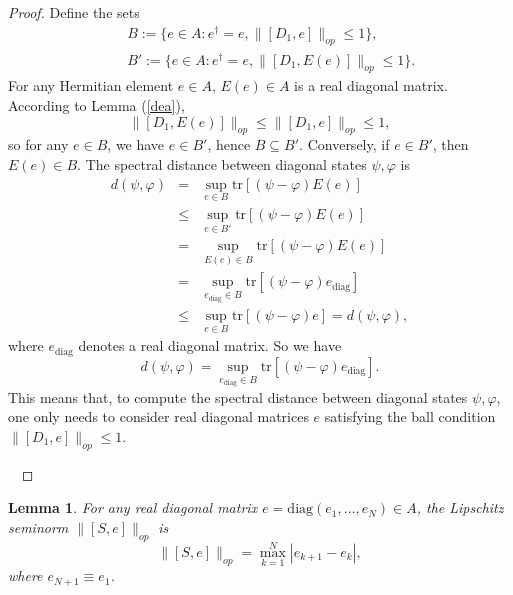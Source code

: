 \documentclass[a4paper,11pt]{article}
\newtheorem{lemma}{Lemma}
\begin{document}
\begin{proof}
  Define the sets
  \begin{eqnarray}
    &&B := \{e \in A : e^{\dag} = e, \|[D_1, e]\|_{op} \leqslant 1\}, \nonumber\\
    &&B':= \{e \in A : e^{\dag} = e, \|[D_1, E (e)]\|_{op} \leqslant 1\} .
  \end{eqnarray}
  For any Hermitian element $e \in A$, $E (e) \in A$ is a real diagonal
  matrix. According to Lemma (\ref{dea}),
  \begin{equation}
    \|[D_1, E (e)]\|_{op} \leqslant \|[D_1, e]\|_{op} \leqslant 1,
  \end{equation}
  so for any $e \in B$, we have $e \in B'$, hence $B \subseteq B'$.
  Conversely, if $e \in B'$, then $E (e) \in B$. The spectral distance between
  diagonal states $\psi, \varphi$ is
  \begin{eqnarray}
    d (\psi, \varphi) & = & \sup_{e \in B} \mathrm{tr} [(\psi - \varphi) E
    (e)] \nonumber\\
    & \leqslant & \sup_{e \in B'} \mathrm{tr} [(\psi - \varphi) E (e)]
    \nonumber\\
    & = & \sup_{E (e) \in B} \mathrm{tr} [(\psi - \varphi) E (e)]
    \nonumber\\
    & = & \sup_{e_{\mathrm{diag}} \in B} \mathrm{tr} [(\psi - \varphi)
    e_{\mathrm{diag}}] \nonumber\\
    & \leqslant & \sup_{e \in B} \mathrm{tr} [(\psi - \varphi) e] = d
    (\psi, \varphi), 
  \end{eqnarray}
  where $e_{\mathrm{diag}}$ denotes a real diagonal matrix. So we have
  \begin{equation}
    d (\psi, \varphi) = \sup_{e_{\mathrm{diag}} \in B} \mathrm{tr} [(\psi -
    \varphi) e_{\mathrm{diag}}] .
  \end{equation}
  This means that, to compute the spectral distance between diagonal states $\psi,
  \varphi$, one only needs to consider real diagonal matrices $e$ satisfying
  the ball condition $\|[D_1, e]\|_{op} \leqslant 1$.
  
  \ 
\end{proof}

\begin{lemma}
  For any real diagonal matrix $e = \mathrm{diag} (e_1, \ldots, e_N) \in A$,
  the Lipschitz seminorm $\|[S, e]\|_{op}$ is
  \begin{equation}\label{se}
    \|[S, e]\|_{op} = \max_{k = 1}^N |e_{k + 1} - e_k |,
  \end{equation}
  where $e_{N + 1} \equiv e_1$.
\end{lemma}
\end{document}
